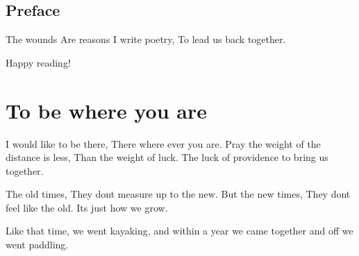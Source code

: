 \documentclass[
]{book}
\newenvironment{Shaded}{\begin{snugshade}}{\end{snugshade}}
\newcommand{\NormalTok}[1]{#1}
\newcommand{\StringTok}[1]{\textcolor[rgb]{0.31,0.60,0.02}{#1}}
\begin{document}
\hypertarget{preface}{%
\section{Preface}\label{preface}}

\begin{Shaded}
\begin{Highlighting}[]
\NormalTok{The wounds }
\NormalTok{Are reasons }
\NormalTok{I write poetry,}
\NormalTok{To lead us }
\NormalTok{back together.}
\end{Highlighting}
\end{Shaded}

Happy reading!

\hypertarget{to-be-where-you-are}{%
\chapter{To be where you are}\label{to-be-where-you-are}}

\begin{Shaded}
\begin{Highlighting}[]
\NormalTok{I would like to be there,}
\NormalTok{There where ever you are.}
\NormalTok{Pray the weight of the distance is less,}
\NormalTok{Than the weight of luck.}
\NormalTok{The luck of providence to bring us together.}

\NormalTok{The old times,}
\NormalTok{They don}\StringTok{\textquotesingle{}t measure up to the new.}
\StringTok{But the new times,}
\StringTok{They don\textquotesingle{}}\NormalTok{t feel like the old.}
\NormalTok{It}\StringTok{\textquotesingle{}s just how we grow.}

\StringTok{Like that time,}
\StringTok{we went kayaking,}
\StringTok{and within a year }
\StringTok{we came together }
\StringTok{and off we went paddling.}
\end{Highlighting}
\end{Shaded}
\end{document}
